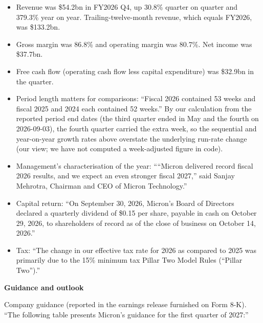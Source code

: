 \documentclass[a4paper,10pt]{article}
\begin{document}
\begin{itemize}\setlength{\itemsep}{1pt}
\item Revenue was \$54.2bn in FY2026 Q4, up 30.8\% quarter on quarter and 379.3\% year on year. Trailing-twelve-month revenue, which equals FY2026, was \$133.2bn.
\item Gross margin was 86.8\% and operating margin was 80.7\%. Net income was \$37.7bn.
\item Free cash flow (operating cash flow less capital expenditure) was \$32.9bn in the quarter.
\item Period length matters for comparisons: “Fiscal 2026 contained 53 weeks and fiscal 2025 and 2024 each contained 52 weeks.” By our calculation from the reported period end dates (the third quarter ended in May and the fourth on 2026-09-03), the fourth quarter carried the extra week, so the sequential and year-on-year growth rates above overstate the underlying run-rate change (our view; we have not computed a week-adjusted figure in code).
\item Management's characterisation of the year: ““Micron delivered record fiscal 2026 results, and we expect an even stronger fiscal 2027,” said Sanjay Mehrotra, Chairman and CEO of Micron Technology.”
\item Capital return: “On September 30, 2026, Micron’s Board of Directors declared a quarterly dividend of \$0.15 per share, payable in cash on October 29, 2026, to shareholders of record as of the close of business on October 14, 2026.”
\item Tax: “The change in our effective tax rate for 2026 as compared to 2025 was primarily due to the 15\% minimum tax Pillar Two Model Rules (“Pillar Two”).”
\end{itemize}

\par\smallskip\textbf{\color{MemoBlue}Guidance and outlook}\par

Company guidance (reported in the earnings release furnished on Form 8-K). “The following table presents Micron’s guidance for the first quarter of 2027:”
\end{document}

